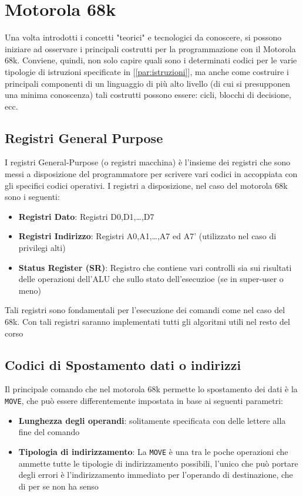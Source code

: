 \section{Motorola 68k}
Una volta introdotti i concetti "teorici" e tecnologici da conoscere, si possono iniziare ad osservare i principali costrutti per la programmazione con il Motorola 68k.
Conviene, quindi, non solo capire quali sono i determinati codici per le varie tipologie di istruzioni specificate in [\ref{par:istruzioni}], ma anche come costruire i principali componenti di un linguaggio di più alto livello (di cui si presupponen una minima conoscenza) tali costrutti possono essere: cicli, blocchi di decisione, ecc.

\subsection{Registri General Purpose}
I registri General-Purpose (o registri macchina) è l'insieme dei registri che sono messi a disposizione del programmatore per scrivere vari codici in accoppiata con gli specifici codici operativi.
I registri a disposizione, nel caso del motorola 68k sono i seguenti:
\begin{itemize}
    \item \textbf{Registri Dato}: Registri D0,D1,\dots,D7
    \item \textbf{Registri Indirizzo}: Registri A0,A1,\dots,A7 ed A7' (utilizzato nel caso di privilegi alti)
    \item \textbf{Status Register (SR)}: Registro che contiene vari controlli sia sui risultati delle operazioni dell'ALU che sullo stato dell'esecuzioe (se in super-user o meno)
\end{itemize}

Tali registri sono fondamentali per l'esecuzione dei comandi come nel caso del 68k. Con tali registri saranno implementati tutti gli algoritmi utili nel resto del corso

\subsection{Codici di Spostamento dati o indirizzi}
Il principale comando che nel motorola 68k permette lo spostamento dei dati è la \lstinline|MOVE|, che può essere differentemente impostata in base ai seguenti parametri:

\begin{itemize}
    \item \textbf{Lunghezza degli operandi}: solitamente specificata con delle lettere alla fine del comando
    \item \textbf{Tipologia di indirizzamento}: La \lstinline|MOVE| è una tra le poche operazioni che ammette tutte le tipologie di indirizzamento possibili, l'unico che può portare degli errori è l'indirizzamento immediato per l'operando di destinazione, che di per se non ha senso
\end{itemize}

